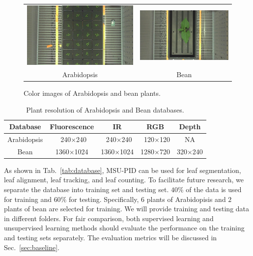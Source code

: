 \begin{figure}
\begin{centering}
\begin{tabular}{c c}
\includegraphics[width=.45\textwidth]{Figures/rawImages/a.png}&
\includegraphics[width=.45\textwidth]{Figures/rawImages/b.png}\\
  Arabidopsis & Bean \\
\end{tabular}
\caption{Color images of Arabidopsis and bean plants. }
\label{fig:rawIm}
\end{centering}
\end{figure}

\begin{table}
\begin{center}
\caption{Plant resolution of Arabidopsis and Bean databases.}
\label{tab:resolution}
\begin{tabular}{c|c|c|c|c}
      \hline
      Database     & Fluorescence       & IR        & RGB      & Depth     \\
      \hline
      Arabidopsis &  ~240$\times$240 &  ~240$\times$240 & ~120$\times$120  & NA  \\
      Bean        & 1360$\times$1024 & 1360$\times$1024 & 1280$\times$720 & 320$\times$240    \\
      \hline
\end{tabular}
\end{center}
\end{table}


As shown in Tab.~\ref{tab:database}, MSU-PID can be used for leaf segmentation, leaf alignment, leaf tracking, and leaf counting.
To facilitate future research, we separate the database into training set and testing set.
$40\%$ of the data is used for training and $60\%$ for testing.
Specifically, $6$ plants of Arabidopisis and $2$ plants of bean are selected for training.
We will provide training and testing data in different folders.
For fair comparison, both supervised learning and unsupervised learning methods should evaluate the performance on the training and testing sets separately.
The evaluation metrics will be discussed in Sec.~\ref{sec:baseline}.




